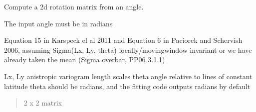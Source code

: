 \documentclass[letterpaper,10pt,english]{sphinxmanual}
\begin{document}
\begin{fulllineitems}
\label{\detokenize{misc:glomar_gridding.distances.rot_mat}}
\pysigstartsignatures
\pysiglinewithargsret
{}
{}
{}
\pysigstopsignatures
\sphinxAtStartPar
Compute a 2d rotation matrix from an angle.

\sphinxAtStartPar
The input angle must be in radians
\begin{quote}\begin{description}
\sphinxAtStartPar
{}

\end{description}\end{quote}

\end{fulllineitems}


\begin{fulllineitems}
\label{\detokenize{misc:glomar_gridding.distances.sigma_rot_func}}
\pysigstartsignatures
\pysiglinewithargsret
{}
{\sphinxparamcomma {}\sphinxparamcomma {}}
{}
\pysigstopsignatures
\sphinxAtStartPar
Equation 15 in Karspeck el al 2011 and Equation 6
in Paciorek and Schervish 2006,
assuming Sigma(Lx, Ly, theta) locally/moving\sphinxhyphen{}window invariant or
we have already taken the mean (Sigma overbar, PP06 3.1.1)

\sphinxAtStartPar
Lx, Ly \sphinxhyphen{} anistropic variogram length scales
theta \sphinxhyphen{} angle relative to lines of constant latitude
theta should be radians, and the fitting code outputs radians by default
\begin{quote}\begin{description}
\sphinxAtStartPar
{} \textendash{} 2 x 2 matrix

\sphinxAtStartPar
{}

\end{description}\end{quote}

\end{fulllineitems}
\end{document}
